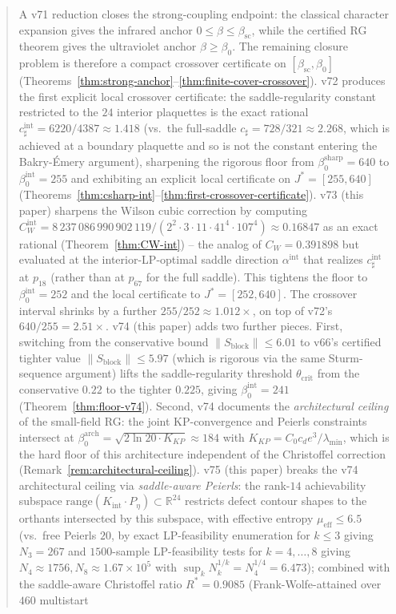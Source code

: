 \documentclass[11pt]{article}
\theoremstyle{definition}
\newcommand{\R}{\mathbb{R}}
\newcommand{\betasc}{\beta_{\mathrm{sc}}}
\begin{document}
\begin{abstract}
A v71 reduction closes the strong-coupling endpoint: the classical character expansion gives the infrared anchor $0\le\beta\le\betasc$, while the certified RG theorem gives the ultraviolet anchor $\beta\ge\beta_0$.  The remaining closure problem is therefore a compact crossover certificate on $[\betasc,\beta_0]$ (Theorems~\ref{thm:strong-anchor}--\ref{thm:finite-cover-crossover}).  v72 produces the first explicit local crossover certificate: the saddle-regularity constant restricted to the $24$ interior plaquettes is the exact rational $c_\sharp^{\mathrm{int}}=6220/4387\approx 1.418$ \textup{(}vs.\ the full-saddle $c_\sharp=728/321\approx 2.268$, which is achieved at a boundary plaquette and so is not the constant entering the Bakry-\'Emery argument\textup{)}, sharpening the rigorous floor from $\beta_0^{\mathrm{sharp}}=640$ to $\beta_0^{\mathrm{int}}=255$ and exhibiting an explicit local certificate on $J^*=[255,640]$ \textup{(}Theorems~\ref{thm:csharp-int}--\ref{thm:first-crossover-certificate}\textup{)}.  v73 \textup{(}this paper\textup{)} sharpens the Wilson cubic correction by computing $C_W^{\mathrm{int}}=8\,237\,086\,990\,902\,119/(2^2\cdot 3\cdot 11\cdot 41^4\cdot 107^4)\approx 0.16847$ as an exact rational \textup{(}Theorem~\ref{thm:CW-int}\textup{)} -- the analog of $C_W=0.391898$ but evaluated at the interior-LP-optimal saddle direction $\alpha^{\mathrm{int}}$ that realizes $c_\sharp^{\mathrm{int}}$ at $p_{18}$ \textup{(}rather than at $p_{67}$ for the full saddle\textup{)}.  This tightens the floor to $\beta_0^{\mathrm{int}}=252$ and the local certificate to $J^*=[252,640]$.  The crossover interval shrinks by a further $255/252\approx 1.012\times$, on top of v72's $640/255=2.51\times$.  v74 \textup{(}this paper\textup{)} adds two further pieces.  First, switching from the conservative bound $\|S_{\mathrm{block}}\|\le 6.01$ to v66's certified tighter value $\|S_{\mathrm{block}}\|\le 5.97$ \textup{(}which is rigorous via the same Sturm-sequence argument\textup{)} lifts the saddle-regularity threshold $\theta_{\mathrm{crit}}$ from the conservative $0.22$ to the tighter $0.225$, giving $\beta_0^{\mathrm{int}}=241$ \textup{(}Theorem~\ref{thm:floor-v74}\textup{)}.  Second, v74 documents the \emph{architectural ceiling} of the small-field RG: the joint KP-convergence and Peierls constraints intersect at $\beta_0^{\mathrm{arch}}=\sqrt{2\ln 20\cdot K_{KP}}\approx 184$ with $K_{KP}=C_0 c_d e^3/\lambda_{\min}$, which is the hard floor of this architecture independent of the Christoffel correction \textup{(}Remark~\ref{rem:architectural-ceiling}\textup{)}.  v75 \textup{(}this paper\textup{)} breaks the v74 architectural ceiling via \emph{saddle-aware Peierls}: the rank-$14$ achievability subspace $\mathrm{range}(K_{\mathrm{int}}\cdot P_\eta)\subset\R^{24}$ restricts defect contour shapes to the orthants intersected by this subspace, with effective entropy $\mu_{\mathrm{eff}}\le 6.5$ \textup{(}vs.\ free Peierls $20$, by exact LP-feasibility enumeration for $k\le 3$ giving $N_3=267$ and $1500$-sample LP-feasibility tests for $k=4,\dots,8$ giving $N_4\approx 1756, N_8\approx 1.67\times 10^5$ with $\sup_kN_k^{1/k}=N_4^{1/4}=6.473$\textup{)}; combined with the saddle-aware Christoffel ratio $R^*=0.9085$ \textup{(}Frank-Wolfe-attained over $460$ multistart 
\end{abstract}
\end{document}
